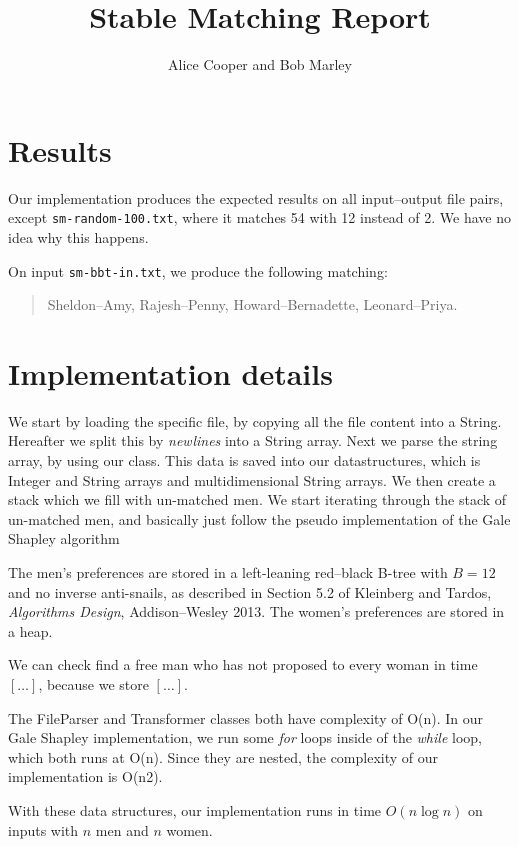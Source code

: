 \documentclass{tufte-handout}
\title{Stable Matching Report}
\author{Alice Cooper and Bob Marley}
\begin{document}
  \maketitle

  \section{Results}

  Our implementation produces the expected results on all input--output file pairs, except {\tt sm-random-100.txt}, where it matches 54 with 12 instead of 2.
  We have no idea why this happens.%

  On input {\tt sm-bbt-in.txt}, we produce the following matching:
  \begin{quotation}
    Sheldon--Amy, Rajesh--Penny, Howard--Bernadette, Leonard--Priya.  
  \end{quotation}

  \section{Implementation details}
  
  We start by loading the specific file, by copying all the file content into a String. Hereafter we split this by \textit{newlines} into a String array.
  Next we parse the string array, by using our class. This data is saved into our datastructures, which is Integer and
  String arrays and multidimensional String arrays. We then create a stack which we fill with un-matched men. 
  We start iterating through the stack of un-matched men, and basically just follow the pseudo implementation of the Gale Shapley algorithm 

  The men's preferences are stored in a left-leaning red--black B-tree with $B=12$ and no inverse anti-snails,%
   as described in Section 5.2 of Kleinberg and Tardos, \emph{Algorithms Design}, Addison--Wesley 2013.%
  The women's preferences are stored in a heap.

  We can check find a free man who has not proposed to every woman in time $[\ldots]$,
  because we store $[\ldots]$.
  
  The FileParser and Transformer classes both have complexity of O(n). In our Gale Shapley implementation, we run some \textit{for} loops inside of the \textit{while} loop,
  which both runs at O(n). Since they are nested, the complexity of our implementation is O(n2). 

  With these data structures, our implementation runs in time $O(n\log n)$  
  on inputs with $n$ men and $n$ women.
\end{document}
